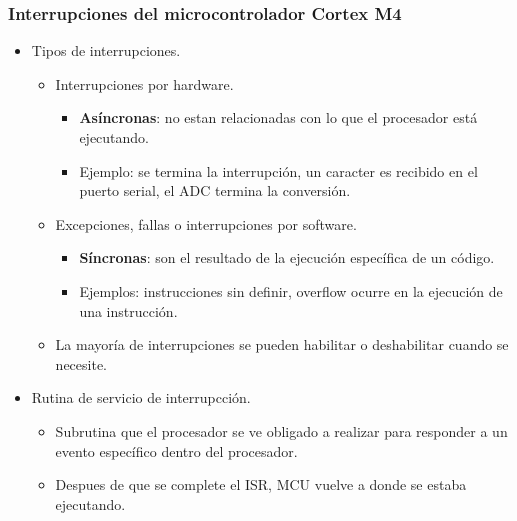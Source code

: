 \documentclass[10.5pt,scale=1.0,t,aspectratio=169,hyperref={pdfpagelabels=false}]{beamer}
\begin{document}
\begin{frame}
	\frametitle{Interrupciones del microcontrolador Cortex M4}
	\begin{itemize}
		\item Tipos de interrupciones.
		\begin{itemize}
			\item Interrupciones por hardware.
			\begin{itemize}
				\item \textbf{Asíncronas}: no estan relacionadas con lo que el procesador está ejecutando. 
				\item Ejemplo: se termina la interrupción, un caracter es recibido en el puerto serial, el ADC termina la conversión. 
			\end{itemize}
			\item Excepciones, fallas o interrupciones por software.
			\begin{itemize}
				\item \textbf{Síncronas}: son el resultado de la ejecución específica de un código.
				\item Ejemplos: instrucciones sin definir, overflow ocurre en la ejecución de una instrucción.
			\end{itemize}
			\item La mayoría de interrupciones se pueden habilitar o deshabilitar cuando se necesite.  
		\end{itemize}
		\item Rutina de servicio de interrupcción.
		\begin{itemize}
			\item Subrutina que el procesador se ve obligado a realizar para responder a un evento específico dentro del procesador.
			\item Despues de que se complete el ISR, MCU vuelve a donde se estaba ejecutando. 
		\end{itemize}
	\end{itemize}
\end{frame}
\end{document}
